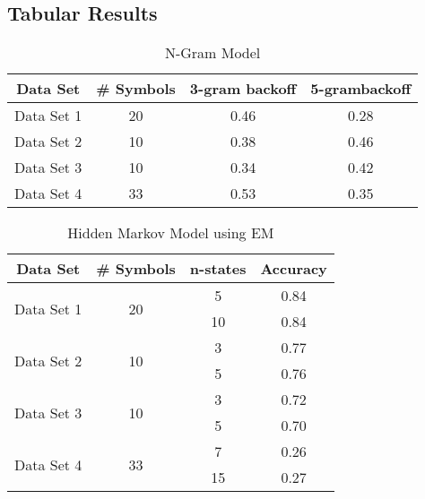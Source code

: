 \documentclass{article} %
\begin{document}
\subsection{Tabular Results}
\begin{table}[H]
\caption{N-Gram Model}
\label{N-Gram_model}
\begin{center}
\begin{tabular}{ |c|c|c|c| }
\hline
\multicolumn{1}{|c|}{\bf Data Set} &\multicolumn{1}{|c|}{\bf \# Symbols} &\multicolumn{1}{|c|}{\bf 3-gram backoff} &\multicolumn{1}{|c|}{\bf 5-grambackoff}\\
\hline
\multirow{1}{*}{Data Set 1}& \multirow{1}{*}{20} & 0.46 & 0.28 \\
\hline
\multirow{1}{*}{Data Set 2}& \multirow{1}{*}{10} & 0.38 & 0.46  \\
\hline
\multirow{1}{*}{Data Set 3}& \multirow{1}{*}{10} & 0.34 & 0.42 \\
\hline
\multirow{1}{*}{Data Set 4}& \multirow{1}{*}{33} & 0.53 & 0.35 \\
\hline
\end{tabular}
\end{center}
\end{table}


\begin{table}[H]
\caption{Hidden Markov Model using EM}
\label{HMM_EM}
\begin{center}
\begin{tabular}{ |c|c|c|c| }
\hline
\multicolumn{1}{|c|}{\bf Data Set} &\multicolumn{1}{|c|}{\bf\# Symbols} &\multicolumn{1}{|c|}{\bf n-states} &\multicolumn{1}{|c|}{\bf Accuracy}\\
\hline
\multirow{2}{*}{Data Set 1}& \multirow{2}{*}{20} & 5 & 0.84 \\
& & 10 & 0.84 \\
\hline
\multirow{2}{*}{Data Set 2}& \multirow{2}{*}{10} & 3 & 0.77 \\
& & 5 & 0.76 \\
\hline
\multirow{2}{*}{Data Set 3}& \multirow{2}{*}{10} & 3 & 0.72 \\
& & 5 & 0.70 \\
\hline
\multirow{2}{*}{Data Set 4}& \multirow{2}{*}{33} & 7 & 0.26 \\
& & 15 & 0.27 \\
\hline
\end{tabular}
\end{center}
\end{table}
\end{document}
